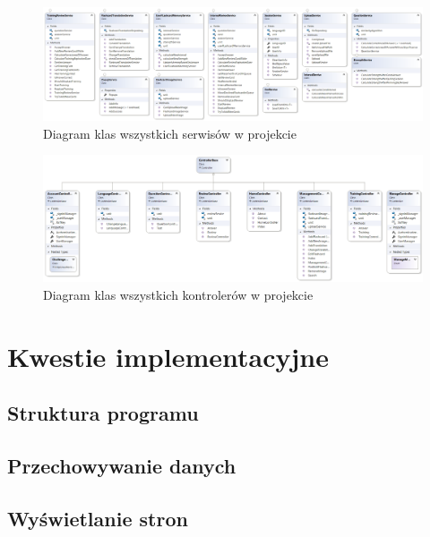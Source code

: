 \begin{figure}
	\centering
	\includegraphics[width=\textwidth]{images/Serwisy.png}
	 \caption{Diagram klas wszystkich serwisów w projekcie}
\end{figure}


\begin{figure}
	\centering
	\includegraphics[width=\textwidth]{images/Controllers.png}
	 \caption{Diagram klas wszystkich kontrolerów w projekcie}
\end{figure}




\newpage
{\let\cleardoublepage\relax \chapter{Kwestie implementacyjne}}

\section{Struktura programu}

\section{Przechowywanie danych}

\section{Wyświetlanie stron}
